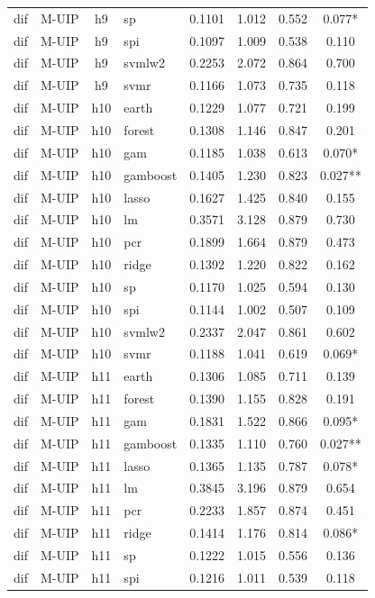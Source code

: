 \begin{ThreePartTable}
\begin{longtable}[t]{llclcccc}
dif & M-UIP & h9 & sp & 0.1101 & 1.012 & 0.552 & 0.077*\\
dif & M-UIP & h9 & spi & 0.1097 & 1.009 & 0.538 & 0.110\\
dif & M-UIP & h9 & svmlw2 & 0.2253 & 2.072 & 0.864 & 0.700\\
dif & M-UIP & h9 & svmr & 0.1166 & 1.073 & 0.735 & 0.118\\
\addlinespace
dif & M-UIP & h10 & earth & 0.1229 & 1.077 & 0.721 & 0.199\\
dif & M-UIP & h10 & forest & 0.1308 & 1.146 & 0.847 & 0.201\\
dif & M-UIP & h10 & gam & 0.1185 & 1.038 & 0.613 & 0.070*\\
dif & M-UIP & h10 & gamboost & 0.1405 & 1.230 & 0.823 & 0.027**\\
dif & M-UIP & h10 & lasso & 0.1627 & 1.425 & 0.840 & 0.155\\
dif & M-UIP & h10 & lm & 0.3571 & 3.128 & 0.879 & 0.730\\
dif & M-UIP & h10 & pcr & 0.1899 & 1.664 & 0.879 & 0.473\\
dif & M-UIP & h10 & ridge & 0.1392 & 1.220 & 0.822 & 0.162\\
dif & M-UIP & h10 & sp & 0.1170 & 1.025 & 0.594 & 0.130\\
dif & M-UIP & h10 & spi & 0.1144 & 1.002 & 0.507 & 0.109\\
dif & M-UIP & h10 & svmlw2 & 0.2337 & 2.047 & 0.861 & 0.602\\
dif & M-UIP & h10 & svmr & 0.1188 & 1.041 & 0.619 & 0.069*\\
\addlinespace
dif & M-UIP & h11 & earth & 0.1306 & 1.085 & 0.711 & 0.139\\
dif & M-UIP & h11 & forest & 0.1390 & 1.155 & 0.828 & 0.191\\
dif & M-UIP & h11 & gam & 0.1831 & 1.522 & 0.866 & 0.095*\\
dif & M-UIP & h11 & gamboost & 0.1335 & 1.110 & 0.760 & 0.027**\\
dif & M-UIP & h11 & lasso & 0.1365 & 1.135 & 0.787 & 0.078*\\
dif & M-UIP & h11 & lm & 0.3845 & 3.196 & 0.879 & 0.654\\
dif & M-UIP & h11 & pcr & 0.2233 & 1.857 & 0.874 & 0.451\\
dif & M-UIP & h11 & ridge & 0.1414 & 1.176 & 0.814 & 0.086*\\
dif & M-UIP & h11 & sp & 0.1222 & 1.015 & 0.556 & 0.136\\
dif & M-UIP & h11 & spi & 0.1216 & 1.011 & 0.539 & 0.118\\

\end{longtable}
\end{ThreePartTable}
